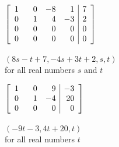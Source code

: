 \documentclass{ximera}
\begin{document}
\begin{question}
\begin{problem}
$\left[ \begin{array}{rrrr|r} 
1 & \hphantom{-}0 & -8 & 1 & 7 \\ 
0 & 1 & 4 & -3 & 2 \\ 
0 & 0 & 0 & 0 & 0 \\
0 & 0 & 0 & 0 & 0 
\end{array} \right]$

\begin{solution}
$(8s - t + 7, -4s + 3t + 2, s, t)$ \\ for all real numbers $s$ and $t$
\end{solution}
\end{problem}

\begin{problem}\label{decodelast}
$\left[ \begin{array}{rrr|r} 
1 & \hphantom{-}0 & 9 & -3 \\ 
0 & 1 & -4 & 20 \\ 
0 & 0 & 0 & 0  
\end{array} \right]$

\begin{solution}
$(-9t - 3, 4t + 20, t)$ \\ for all real numbers $t$
\end{solution}
\end{problem}

\end{question}
\end{document}
